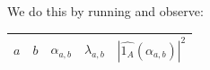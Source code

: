 \documentclass{article}
\theoremstyle{definition}
\theoremstyle{remark}
\numberwithin{equation}{section}
\begin{document}
We do this by running  and observe: 

\begin{tabular}{|lllll|}
\hline
$a$ & $b$ & $\alpha_{a,b}$ & $\lambda_{a,b}$ & $|\widehat{1_A}(\alpha_{a,b})|^2$\\
\hline
\end{tabular}
\end{document}
